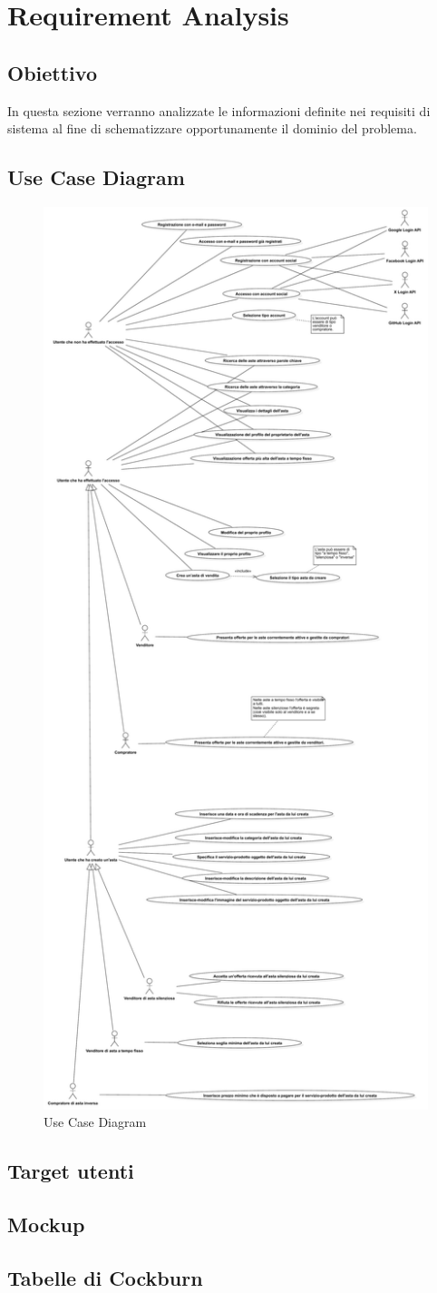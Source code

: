 
\chapter{Requirement Analysis}
    \section{Obiettivo}
        In questa sezione verranno analizzate le informazioni definite nei requisiti di sistema al fine di schematizzare opportunamente il dominio del problema.

    \section{Use Case Diagram}
        \begin{figure}[htbp!]
            \centering
                \vspace{2\baselineskip}
                \includegraphics[width=0.35\linewidth]{Immagini/Diagrammi/UseCaseDiagram.pdf}
            \caption{Use Case Diagram}
            \label{fig:Use Case Diagram}
        \end{figure}

    \newpage
    
    \section{Target utenti}
    


    \section{Mockup}

    \section{Tabelle di Cockburn}